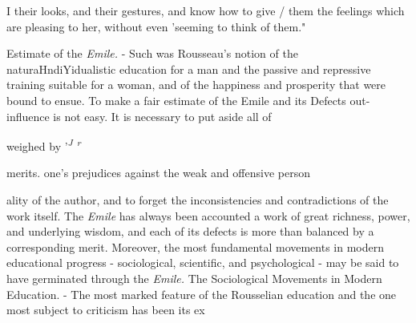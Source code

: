 \documentclass[]{book}
\begin{document}
I their looks, and their gestures, and know how to give / them the feelings which are pleasing to her, without even 'seeming to think of them."

Estimate of the \emph{Emile.} - Such was Rousseau's notion of the naturaHndiYidualistic education for a man and the passive and repressive training suitable for a woman, and of the happiness and prosperity that were bound to ensue. To make a fair estimate of the Emile and its Defects out- influence is not easy. It is necessary to put aside all of

weighed by '\emph{\textsuperscript{J} \textsuperscript{r}}

merits. one's prejudices against the weak and offensive person

ality of the author, and to forget the inconsistencies and contradictions of the work itself. The \emph{Emile} has always been accounted a work of great richness, power, and underlying wisdom, and each of its defects is more than balanced by a corresponding merit. Moreover, the most fundamental movements in modern educational progress - sociological, scientific, and psychological - may be said to have germinated through the \emph{Emile.} The Sociological Movements in Modern Education. - The most marked feature of the Rousselian education and the one most subject to criticism has been its ex
\end{document}
